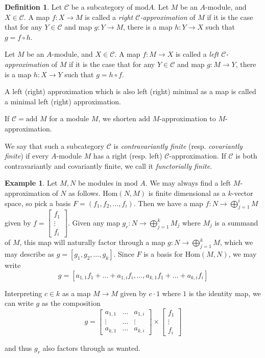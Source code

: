 \documentclass[]{article}
\theoremstyle{definition}
\newtheorem{definition}{Definition}[section]
\newtheorem{example}{Example}[section]
\begin{document}
\begin{definition}
	Let $\mathcal{C}$ be a subcategory of $\text{mod} A$.  Let $M$ be an $A$-module, and $X \in \mathcal{C}$. A map $f:X \to M$ is called a \textit{right $\mathcal{C}$-approximation} of $M$ if it is the case that for any $Y \in \mathcal{C}$ and map $g:Y \to M$, there is a map $h:Y \to X$ such that $g = f \circ h$. 
	
	Let $M$ be an $A$-module, and $X \in \mathcal{C}$. A map $f:M \to X$ is called a \textit{left $\mathcal{C}$-approximation} of $M$ if it is the case that for any $Y \in \mathcal{C}$ and map $g:M \to Y$, there is a map $h:X \to Y$ such that $g = h \circ f$. 
	
	A left (right) approximation which is also left (right) minimal as a map is called a minimal left (right) approximation.
	
	If $\mathcal{C} = \text{add } M$ for a module $M$, we shorten $\text{add }M$-approximation to $M$-approximation.
\end{definition}


We say that such a subcategory $\mathcal{C}$ is \textit{contravariantly finite} (resp. \textit{covariantly finite}) if every $A$-module $M$ has a right (resp. left) $\mathcal{C}$-approximation. If $\mathcal{C}$ is both contravariantly and covariantly finite, we call it \textit{functorially finite}.


\begin{example}
	Let $M,N$ be modules in $\text{mod } A$. We may always find a left $M$-approximation of $N$ as follows. $\text{Hom}(N,M)$ is finite dimensional as a $k$-vector space, so pick a basis $F = (f_1,f_2,\dots,f_i)$. Then we have a map $f:N \to \bigoplus_{j= 1}^i M$ given by $f = \begin{bmatrix}
	f_1 \\ \vdots \\ f_i
	\end{bmatrix}$. Given any map $g_r:N \to \bigoplus_{j = 1}^k M_j$ where $M_j$ is a summand of $M$, this map will naturally factor through a map $g:N \to \bigoplus_{j = 1}^k M$, which we may describe as $g = [g_1,g_2,\dots,g_k]$. Since $F$ is a basis for $\text{Hom}(M,N)$, we may write \[g = [a_{1,1}f_1 + \dots + a_{1,i}f_i,\dots,a_{k,1}f_1 + \dots + a_{k,i}f_i]\]
	
	Interpreting $c \in k$ as a map $M \to M$ given by $c \cdot1$ where $1$ is the identity map, we can write $g$ as the composition
	\[g = \begin{bmatrix}
	a_{1,1} & \dots & a_{1,i} \\
	\vdots & \dots & \vdots \\
	a_{k,1} & \dots & a_{k,i}
	\end{bmatrix} \times \begin{bmatrix}
	f_1 \\ \vdots \\ f_i
	\end{bmatrix}
	\]
	
	and thus $g_r$ also factors through as wanted.
\end{example}
\end{document}
